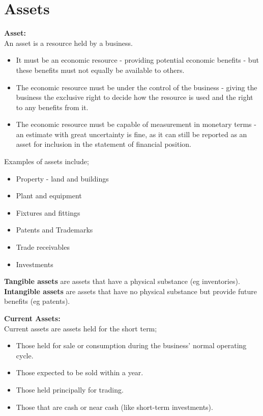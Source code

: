 \documentclass{report}
\newenvironment{blackbox}[1][Black]
  {\begin{tcolorbox}[colframe=#1,colback=white]}
  {\end{tcolorbox}}
\begin{document}
\section{Assets}

\begin{blackbox}
    \textbf{Asset:}\\
    An asset is a resource held by a business.
    \begin{itemize}
        \item It must be an economic resource - providing potential economic benefits - but these benefits must not equally be available to others.
        \item The economic resource must be under the control of the business - giving the business the exclusive right to decide how the resource is used and the right to any benefits from it.
        \item The economic resource must be capable of measurement in monetary terms - an estimate with great uncertainty is fine, as it can still be reported as an asset for inclusion in the statement of financial position.
    \end{itemize}
\end{blackbox}

Examples of assets include;
\begin{itemize}
    \item Property - land and buildings
    \item Plant and equipment
    \item Fixtures and fittings
    \item Patents and Trademarks
    \item Trade receivables
    \item Investments\\
\end{itemize}

\textbf{Tangible assets} are assets that have a physical substance (eg inventories).\\
\textbf{Intangible assets} are assets that have no physical substance but provide future benefits (eg patents).

\begin{blackbox}
    \textbf{Current Assets:}\\
    Current assets are assets held for the short term;
    \begin{itemize}
        \item Those held for sale or consumption during the business' normal operating cycle.
        \item Those expected to be sold within a year.
        \item Those held principally for trading.
        \item Those that are cash or near cash (like short-term investments).
    \end{itemize}
\end{blackbox}
\end{document}
